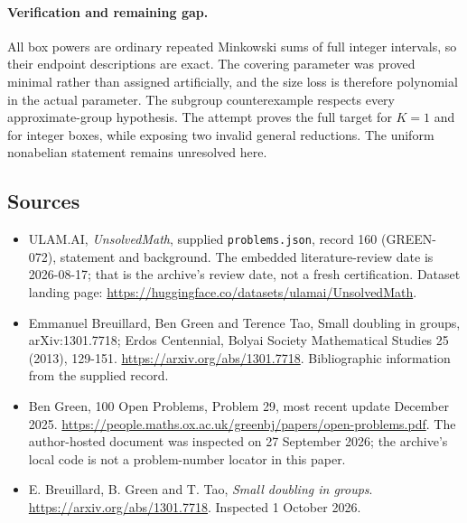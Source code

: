 \documentclass[11pt,a4paper]{article}
\begin{document}
\paragraph{Verification and remaining gap.}
All box powers are ordinary repeated Minkowski sums of full integer intervals, so their endpoint descriptions are exact. The covering parameter was proved minimal rather than assigned artificially, and the size loss is therefore polynomial in the actual parameter. The subgroup counterexample respects every approximate-group hypothesis. The attempt proves the full target for $K=1$ and for integer boxes, while exposing two invalid general reductions. The uniform nonabelian statement remains unresolved here.

\subsection{Sources}

{\small

\begin{itemize}

\item[\hypertarget{source:160:1}{S1}] ULAM.AI, \emph{UnsolvedMath}, supplied \texttt{problems.json}, record 160 (GREEN-072), statement and background. The embedded literature-review date is 2026-08-17; that is the archive’s review date, not a fresh certification. Dataset landing page: \url{https://huggingface.co/datasets/ulamai/UnsolvedMath}.

\item[\hypertarget{source:160:2}{S2}] Emmanuel Breuillard, Ben Green and Terence Tao, Small doubling in groups, arXiv:1301.7718; Erdos Centennial, Bolyai Society Mathematical Studies 25 (2013), 129-151. \url{https://arxiv.org/abs/1301.7718}. Bibliographic information from the supplied record.

\item[\hypertarget{source:160:3}{S3}] Ben Green, 100 Open Problems, Problem 29, most recent update December 2025. \url{https://people.maths.ox.ac.uk/greenbj/papers/open-problems.pdf}. The author-hosted document was inspected on 27 September 2026; the archive’s local code is not a problem-number locator in this paper.

\item[E1] E. Breuillard, B. Green and T. Tao, \emph{Small doubling in groups}. \url{https://arxiv.org/abs/1301.7718}. Inspected 1 October 2026.

\end{itemize}

}

\label{end:160}
\end{document}
